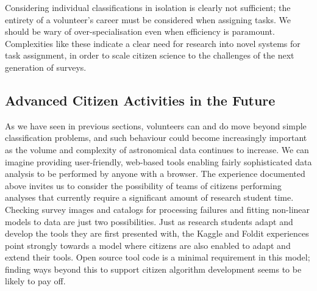 \documentclass{ar2e}
\begin{document}
Considering
individual classifications in isolation is clearly not sufficient; the entirety
of a volunteer's career must be considered when assigning tasks. We should be
wary of over-specialisation even when efficiency is paramount. Complexities like
these indicate a clear need for research into novel systems for task assignment,
in order to scale citizen science to the challenges of the next generation of
surveys. 





\subsection{Advanced Citizen Activities in the Future}

As we have seen in previous sections, volunteers can and do move beyond simple
classification problems, and such behaviour could become increasingly important
as the volume and complexity of astronomical data continues to increase.  We can
imagine providing user-friendly, web-based tools enabling  fairly sophisticated
data analysis to be performed by anyone with a browser. The experience
documented above invites us to consider the possibility of teams of citizens 
performing analyses that currently require a significant amount of research
student time.  Checking survey images and catalogs  for processing failures and
fitting non-linear models to data are just two possibilities. Just as research
students adapt and develop the tools they are first presented with, the Kaggle
and Foldit experiences point strongly towards a model where citizens are also
enabled to adapt and extend their tools. Open source tool code is a minimal requirement in
this model; finding ways beyond this to support citizen algorithm development
seems to be likely to pay off.
\end{document}
